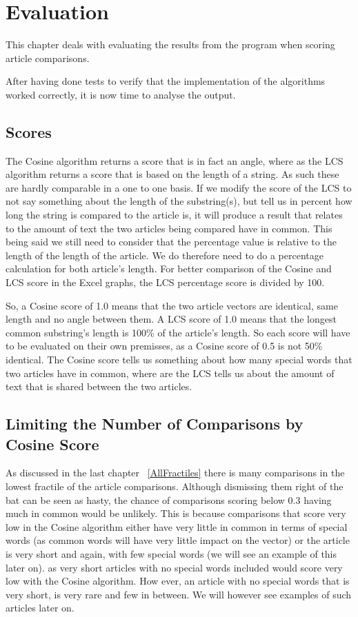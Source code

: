\chapter{Evaluation}
This chapter deals with evaluating the results from the program when scoring article comparisons.

After having done tests to verify that the implementation of the algorithms worked correctly, it is now time to analyse the output.

\section{Scores}

The Cosine algorithm returns a score that is in fact an angle, where as the LCS algorithm returns a score that is based on the length of a string. As such these are hardly comparable in a one to one basis. If we modify the score of the LCS to not say something about the length of the substring(s), but tell us in percent how long the string is compared to the article is, it will produce a result that relates to the amount of text the two articles being compared have in common. This being said we still need to consider that the percentage value is relative to the length of the length of the article. We do therefore need to do a percentage calculation for both article's length. For better comparison of the Cosine and LCS score in the Excel graphs, the LCS percentage score is divided by 100.

So, a Cosine score of 1.0 means that the two article vectors are identical, same length and no angle between them. A LCS score of 1.0 means that the longest common substring's length is 100\% of the article's length. So each score will have to be evaluated on their own premisses, as a Cosine score of 0.5 is not 50\% identical. The Cosine score tells us something about how many special words that two articles have in common, where are the LCS tells us about the amount of text that is shared between the two articles.

\section{Limiting the Number of Comparisons by Cosine Score}

As discussed in the last chapter ~\ref{AllFractiles} there is many comparisons in the lowest fractile of the article comparisons. Although dismissing them right of the bat can be seen as hasty, the chance of comparisons scoring below 0.3 having much in common would be unlikely. This is because comparisons that score very low in the Cosine algorithm either have very little in common in terms of special words (as common words will have very little impact on the vector) or the article is very short and again, with few special words (we will see an example of this later on). as very short articles with no special words included would score very low with the Cosine algorithm. How ever, an article with no special words that is very short, is very rare and few in between. We will however see examples of such articles later on.

